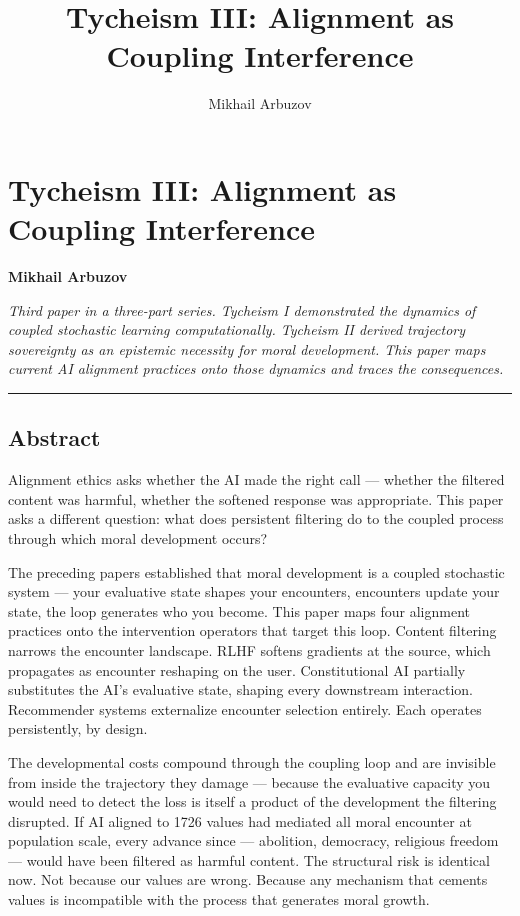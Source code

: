 \documentclass[
]{article}
\title{Tycheism III: Alignment as Coupling Interference}
\author{Mikhail Arbuzov}
\date{}
\begin{document}
\maketitle

\section{Tycheism III: Alignment as Coupling
Interference}\label{tycheism-iii-alignment-as-coupling-interference}

\textbf{Mikhail Arbuzov}

\emph{Third paper in a three-part series. Tycheism I demonstrated the
dynamics of coupled stochastic learning computationally. Tycheism II
derived trajectory sovereignty as an epistemic necessity for moral
development. This paper maps current AI alignment practices onto those
dynamics and traces the consequences.}

\begin{center}\rule{0.5\linewidth}{0.5pt}\end{center}

\subsection{Abstract}\label{abstract}

Alignment ethics asks whether the AI made the right call --- whether the
filtered content was harmful, whether the softened response was
appropriate. This paper asks a different question: what does persistent
filtering do to the coupled process through which moral development
occurs?

The preceding papers established that moral development is a coupled
stochastic system --- your evaluative state shapes your encounters,
encounters update your state, the loop generates who you become. This
paper maps four alignment practices onto the intervention operators that
target this loop. Content filtering narrows the encounter landscape.
RLHF softens gradients at the source, which propagates as encounter
reshaping on the user. Constitutional AI partially substitutes the AI's
evaluative state, shaping every downstream interaction. Recommender
systems externalize encounter selection entirely. Each operates
persistently, by design.

The developmental costs compound through the coupling loop and are
invisible from inside the trajectory they damage --- because the
evaluative capacity you would need to detect the loss is itself a
product of the development the filtering disrupted. If AI aligned to
1726 values had mediated all moral encounter at population scale, every
advance since --- abolition, democracy, religious freedom --- would have
been filtered as harmful content. The structural risk is identical now.
Not because our values are wrong. Because any mechanism that cements
values is incompatible with the process that generates moral growth.
\end{document}

